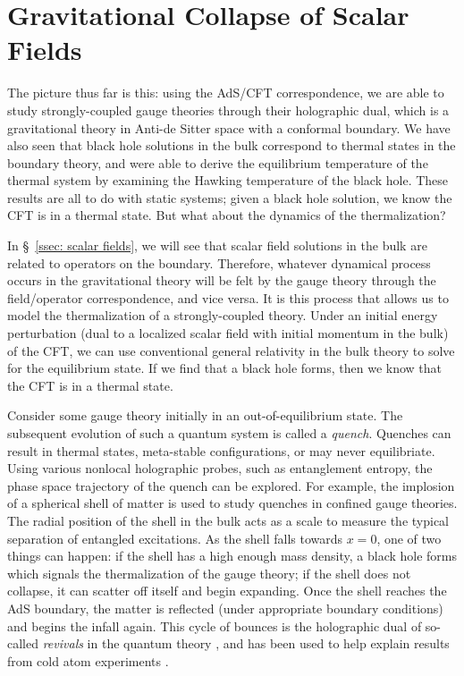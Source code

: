 \documentclass[../PhD.tex]{subfiles}
\begin{document}
\section{Gravitational Collapse of Scalar Fields}
\label{sec: grav collapse}

The picture thus far is this: using the AdS/CFT correspondence, we are able to study strongly-coupled gauge theories through their holographic dual, which is a gravitational theory in Anti-de Sitter space with a conformal boundary. We have also seen that black hole solutions in the bulk correspond to thermal states in the boundary theory, and were able to derive the equilibrium temperature of the thermal system by examining the Hawking temperature of the black hole. These results are all to do with static systems; given a black hole solution, we know the CFT is in a thermal state. But what about the dynamics of the thermalization? 

In \S~\!\ref{ssec: scalar fields}, we will see that scalar field solutions in the bulk are related to operators on the boundary. Therefore, whatever dynamical process occurs in the gravitational theory will be felt by the gauge theory through the field/operator correspondence, and vice versa. It is this process that allows us to model the thermalization of a strongly-coupled theory. Under an initial energy perturbation (dual to a localized scalar field with initial momentum in the bulk) of the CFT, we can use conventional general relativity in the bulk theory to solve for the equilibrium state. If we find that a black hole forms, then we know that the CFT is in a thermal state.

Consider some gauge theory initially in an out-of-equilibrium state. The subsequent evolution of such a quantum system is called a \emph{quench}. Quenches can result in thermal states, meta-stable configurations, or may never equilibriate. Using various nonlocal holographic probes, such as entanglement entropy, the phase space trajectory of the quench can be explored. For example, the implosion of a spherical shell of matter is used to study quenches in confined gauge theories. The radial position of the shell in the bulk acts as a scale to measure the typical separation of entangled excitations. As the shell falls towards $x = 0$, one of two things can happen: if the shell has a high enough mass density, a black hole forms which signals the thermalization of the gauge theory; if the shell does not collapse, it can scatter off itself and begin expanding. Once the shell reaches the AdS boundary, the matter is reflected (under appropriate boundary conditions) and begins the infall again. This cycle of bounces is the holographic dual of so-called \emph{revivals} in the quantum theory \cite{1410.6201, 1412.6002}, and has been used to help explain results from cold atom experiments \cite{Dziarmaga2010, 2011arXiv1106.3567L}.
\end{document}
